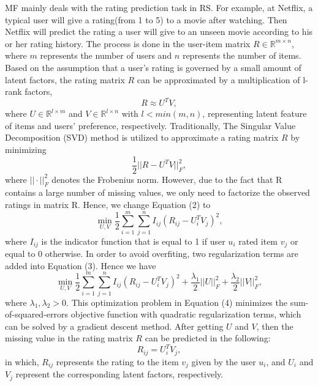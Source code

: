 MF mainly deals with the rating prediction task in RS. For example, at Netflix, a typical user will give a rating(from 1 to 5) to a movie after watching. Then Netflix will predict the rating a user will give to an unseen movie according to his or her rating history. The process is done in the user-item matrix  $R \in \mathbb{R}^{m \times n}$, where $m$ represents the number of users and $n$ represents the number of items. Based on the assumption that a user's rating is governed by a small amount of latent factors, the rating matrix $R$ can be approximated by a multiplication of l-rank factors,
\begin{equation}
R \approx U^TV,
\end{equation}
where $U \in \mathbb{R}^{l \times m}$ and {$V \in \mathbb{R}^{l \times n}$} with $l < min(m, n)$, representing latent feature of items and users' preference, respectively. Traditionally, The Singular Value Decomposition (SVD) method is utilized to approximate a rating matrix $R$ by minimizing
\begin{equation}
\frac{1}{2}||R - U^TV||_F^2,
\end{equation}
where $||\cdot||_F^2$ denotes the Frobenius norm. However, due to the fact that R contains a large number of missing values, we only need to factorize the observed ratings in matrix R. Hence, we change Equation (2) to
\begin{equation}
\min_{U,V}\frac{1}{2}\sum_{i=1}^{m}\sum_{j=1}^{n}I_{ij}(R_{ij} - U_i^TV_j)^2,
\end{equation} 
where $I_{ij}$ is the indicator function that is equal to 1 if user $u_i$ rated item $v_j$ or equal to 0 otherwise. In order to avoid overfiting, two regularization terms are added into Equation (3). Hence we have
\begin{equation}
\min_{U,V}\frac{1}{2}\sum_{i=1}^{m}\sum_{j=1}^{n}I_{ij}(R_{ij} - U_i^TV_j)^2 + \frac{\lambda_1}{2}||U||_F^2 + \frac{\lambda_2}{2}||V||_F^2,
\end{equation} 
where $\lambda_1, \lambda_2 > 0 $. This optimization problem in Equation (4) minimizes the sum-of-squared-errors objective function with quadratic regularization terms, which can be solved by a gradient descent method. After getting $U$ and $V$, then the missing value in the rating matrix $R$ can be predicted in the following:
\begin{equation}
R_{ij} = U_i^TV_j,
\end{equation}
in which, $R_{ij}$ represents the rating to the item $v_j$ given by the user $u_i$, and $U_i$ and $V_j$ represent the corresponding latent factors, respectively.

